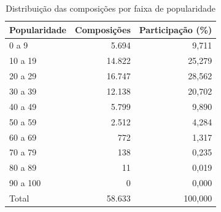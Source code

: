\begin{table}[htbp]
\centering\small
\caption{Distribuição das composições por faixa de popularidade}\label{tab:distribuicao}
\begin{tabular}{lrr}
\toprule
Popularidade & Composições & Participação (\%)\\\midrule
0 a 9 & 5.694 & 9,711\\
10 a 19 & 14.822 & 25,279\\
20 a 29 & 16.747 & 28,562\\
30 a 39 & 12.138 & 20,702\\
40 a 49 & 5.799 & 9,890\\
50 a 59 & 2.512 & 4,284\\
60 a 69 & 772 & 1,317\\
70 a 79 & 138 & 0,235\\
80 a 89 & 11 & 0,019\\
90 a 100 & 0 & 0,000\\
Total & 58.633 & 100,000\\
\bottomrule
\end{tabular}
\end{table}
